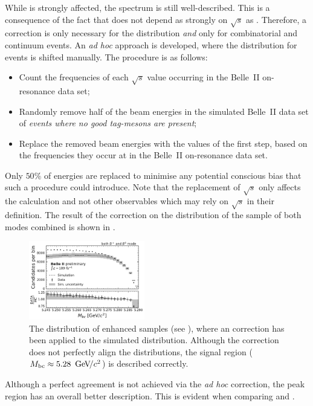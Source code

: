 While \Mbc is strongly affected, the \EB spectrum is still well-described.
This is a consequence of the fact that \EB does not depend as strongly on $\sqrt{s}$ as \Mbc.
Therefore, a correction is only necessary for the \Mbc distribution \textit{and} only for combinatorial \BB and continuum events.
An \textit{ad hoc} approach is developed, where the \Mbc distribution for \MC events is shifted manually. 
The procedure is as follows:
\begin{itemize}
    \item Count the frequencies of each $\sqrt{s}$ value occurring in the Belle~II on-resonance data set;
    \item Randomly remove half of the beam energies in the simulated Belle~II data set of \textit{events where no good tag-\B mesons are present};
    \item Replace the removed beam energies with the values of the first step, based on the frequencies they occur at in the Belle~II on-resonance data set.
\end{itemize}
Only $50\%$ of energies are replaced to minimise any potential conscious bias that such a procedure could introduce.
Note that the replacement of $\sqrt{s}$ only affects the \Mbc calculation and not other observables which may rely on $\sqrt{s}$ in their definition.
The result of the correction on the \Mbc distribution of the sample of both \FEI modes combined is shown in .
\begin{figure}[htbp!]
    \centering
    \includegraphics[width=0.45\textwidth]{figures/data_validation/Bboth_qqbar_enhanced_mbccorrected.pdf}
    \caption{\label{fig:qqbar_enhanced_mbccorrected} The \Mbc distribution of \qqbar enhanced samples (see ),
    where an \Mbc correction has been applied to the simulated distribution.
    Although the correction does not perfectly align the distributions, the signal region (${M_{\mathrm{bc}}}\approx5.28~{\mathrm{\,Ge\kern -0.1em V\!/}c^2}$) is described correctly.}
\end{figure}
Although a perfect agreement is not achieved via the \textit{ad hoc} correction, the peak region has an overall better description. 
This is evident when comparing  and .


